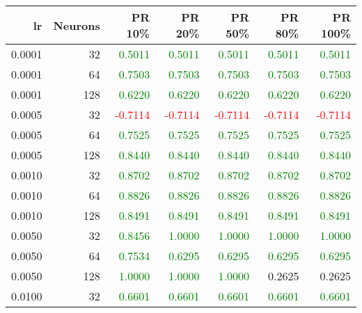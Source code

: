\begin{tabular}{rrrrrrr}
\toprule
lr & Neurons & PR 10\% & PR 20\% & PR 50\% & PR 80\% & PR 100\% \\
\midrule
0.0001 & 32 & \textcolor{green} {0.5011} & \textcolor{green} {0.5011} & \textcolor{green} {0.5011} & \textcolor{green} {0.5011} & \textcolor{green} {0.5011} \\
0.0001 & 64 & \textcolor{green} {0.7503} & \textcolor{green} {0.7503} & \textcolor{green} {0.7503} & \textcolor{green} {0.7503} & \textcolor{green} {0.7503} \\
0.0001 & 128 & \textcolor{green} {0.6220} & \textcolor{green} {0.6220} & \textcolor{green} {0.6220} & \textcolor{green} {0.6220} & \textcolor{green} {0.6220} \\
0.0005 & 32 & \textcolor{red} {-0.7114} & \textcolor{red} {-0.7114} & \textcolor{red} {-0.7114} & \textcolor{red} {-0.7114} & \textcolor{red} {-0.7114} \\
0.0005 & 64 & \textcolor{green} {0.7525} & \textcolor{green} {0.7525} & \textcolor{green} {0.7525} & \textcolor{green} {0.7525} & \textcolor{green} {0.7525} \\
0.0005 & 128 & \textcolor{green} {0.8440} & \textcolor{green} {0.8440} & \textcolor{green} {0.8440} & \textcolor{green} {0.8440} & \textcolor{green} {0.8440} \\
0.0010 & 32 & \textcolor{green} {0.8702} & \textcolor{green} {0.8702} & \textcolor{green} {0.8702} & \textcolor{green} {0.8702} & \textcolor{green} {0.8702} \\
0.0010 & 64 & \textcolor{green} {0.8826} & \textcolor{green} {0.8826} & \textcolor{green} {0.8826} & \textcolor{green} {0.8826} & \textcolor{green} {0.8826} \\
0.0010 & 128 & \textcolor{green} {0.8491} & \textcolor{green} {0.8491} & \textcolor{green} {0.8491} & \textcolor{green} {0.8491} & \textcolor{green} {0.8491} \\
0.0050 & 32 & \textcolor{green} {0.8456} & \textcolor{green} {1.0000} & \textcolor{green} {1.0000} & \textcolor{green} {1.0000} & \textcolor{green} {1.0000} \\
0.0050 & 64 & \textcolor{green} {0.7534} & \textcolor{green} {0.6295} & \textcolor{green} {0.6295} & \textcolor{green} {0.6295} & \textcolor{green} {0.6295} \\
0.0050 & 128 & \textcolor{green} {1.0000} & \textcolor{green} {1.0000} & \textcolor{green} {1.0000} & \textcolor{blu} {0.2625} & \textcolor{blu} {0.2625} \\
0.0100 & 32 & \textcolor{green} {0.6601} & \textcolor{green} {0.6601} & \textcolor{green} {0.6601} & \textcolor{green} {0.6601} & \textcolor{green} {0.6601} \\

\end{tabular}
